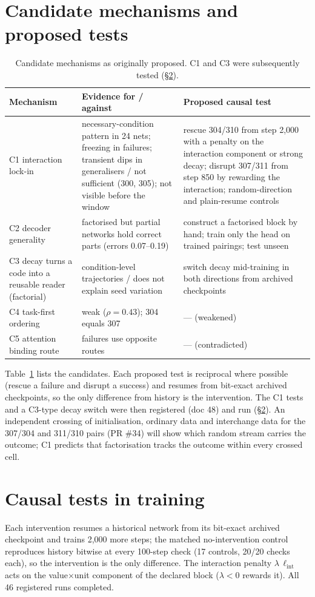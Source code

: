 \documentclass[11pt]{article}
\begin{document}
\section{Candidate mechanisms and proposed tests}
\begin{table}[t]\centering\small
\caption{Candidate mechanisms as originally proposed. C1 and C3 were subsequently tested (\S\ref{sec:causal}).}\label{tab:mech}
\begin{tabular}{@{}p{3.2cm}p{5.4cm}p{6.2cm}@{}}\toprule
Mechanism & Evidence for / against & Proposed causal test\\\midrule
C1 interaction lock-in & necessary-condition pattern in 24 nets; freezing in failures; transient dips in generalisers / not sufficient (300, 305); not visible before the window & rescue 304/310 from step 2,000 with a penalty on the interaction component or strong decay; disrupt 307/311 from step 850 by rewarding the interaction; random-direction and plain-resume controls\\
C2 decoder generality & factorised but partial networks hold correct parts (errors 0.07--0.19) & construct a factorised block by hand; train only the head on trained pairings; test unseen\\
C3 decay turns a code into a reusable reader (factorial) & condition-level trajectories / does not explain seed variation & switch decay mid-training in both directions from archived checkpoints\\
C4 task-first ordering & weak ($\rho=0.43$); 304 equals 307 & --- (weakened)\\
C5 attention binding route & failures use opposite routes & --- (contradicted)\\\bottomrule
\end{tabular}
\end{table}
Table~\ref{tab:mech} lists the candidates. Each proposed test is reciprocal where possible (rescue a failure and
disrupt a success) and resumes from bit-exact archived checkpoints, so the only difference from history is the
intervention. The C1 tests and a C3-type decay switch were then registered (doc 48) and run (\S\ref{sec:causal}).
An independent crossing of
initialisation, ordinary data and interchange data for the 307/304 and 311/310 pairs (PR \#34) will show which random
stream carries the outcome; C1 predicts that factorisation tracks the outcome within every crossed cell.

\section{Causal tests in training}\label{sec:causal}
Each intervention resumes a historical network from its bit-exact archived checkpoint and trains 2,000 more steps; the
matched no-intervention control reproduces history bitwise at every 100-step check (17 controls, 20/20 checks each),
so the intervention is the only difference. The interaction penalty $\lambda\,\ell_{\mathrm{int}}$ acts on the
value$\times$unit component of the declared block ($\lambda<0$ rewards it). All 46 registered runs completed.
\end{document}
